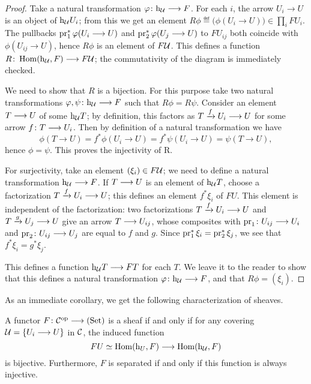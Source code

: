 \begin{2   CONTRAVARIANT FUNCTORS}
\begin{2.3 Sheaves in Grothendieck topologies}
\begin{proof}
Take a natural transformation $\phi\colon \h_{\cU} \arr F$. For each $i$, the arrow $U_{i} \to U$ is an object of $\mathrm{h}_{\mathcal{U}}U_{i}$; from this we get an element $R\phi \eqdef \bigl(\phi(U_{i} \to U)\bigr) \in \prod_i FU_i$. The pullbacks $\operatorname{pr}_{1}^{*} \varphi(U_{i} \longrightarrow U)$ and $\operatorname{pr}_{2}^{*} \varphi(U_{j} \longrightarrow U)$ to $FU_{ij}$ both coincide with $\phi(U_{ij} \to U)$, hence $R\phi$ is an element of $F\mathcal{U}$. This defines a function $R \colon \hom(\h_{\cU}, F) \arr F\cU$; the commutativity of the diagram is immediately checked.

We need to show that $R$ is a bijection. For this purpose take two natural transformations $\phi, \psi \colon \h_{\cU} \arr F$ such that $R\phi = R\psi$. Consider an element $T \arr U$ of some $\mathrm{h}_{\mathcal{U}}T$; by definition, this factors as $T \xarr{f} U_{i} \arr U$ for some arrow $f \colon T \arr U_{i}$. Then by definition of a natural transformation we have
   \[
   \phi(T \to U) = f^{*}\phi(U_{i}\to U) =
   f^{*}\psi(U_{i}\to U) = \psi(T \to U),
   \]
hence $\phi = \psi$. This proves the injectivity of R.

For surjectivity, take an element $(\xi_{i}) \in F\mathcal{U}$; we need to define a natural transformation $\h_{\cU} \arr F$. If $T \arr U$ is an element of $\mathrm{h}_{\mathcal{U}}T$, choose a factorization $T \xarr{f} U_{i} \arr U$; this defines an element $f^{*}\xi_{i}$ of $FU$. This element is independent of the factorization: two factorizations $T \xrightarrow{f} U_i \arr U$ and $T \xrightarrow{g} U_j \arr U$ give an arrow $T \arr U_{ij}$, whose composites with $\pr_1 \colon U_{ij} \arr U_i$ and $\pr_2 \colon U_{ij} \arr U_j$ are equal to $f$ and $g$. Since $\operatorname{pr}^*_1 \xi_i = \operatorname{pr}^*_2 \xi_j$, we see that $f^{*}\xi_{i} = g^{*}\xi_{j}$.

This defines a function $\h_{\cU}T \arr FT$ for each $T$. We leave it to the reader to show that this defines a natural transformation $\phi \colon \h_{\cU} \arr F$, and that $R\phi = (\xi_{i})$.
\end{proof}

As an immediate corollary, we get the following characterization of sheaves.

\begin{corollary}\label{cor:funnychar-sheaves}
A functor $F \colon \cC\op \arr \catset$ is a sheaf if and only if for any covering $\mathcal{U} = \{U_i \longrightarrow U\}$ in $\mathcal{C}$, the induced function
   \[
   FU \simeq \hom(\h_U, F) \arr  \hom(\h_\cU, F)
   \]
is bijective. Furthermore, $F$ is separated if and only if this function is always injective.
\end{corollary}


\end{2.3 Sheaves in Grothendieck topologies}
\end{2   CONTRAVARIANT FUNCTORS}

